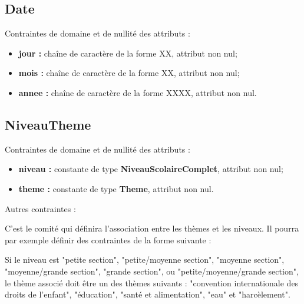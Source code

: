 \documentclass[asi, sansVersion]{picInsa}
\begin{document}
\subsection*{Date}
Contraintes de domaine et de nullité des attributs :
\begin{itemize}
	\item \textbf{jour :} chaîne de caractère de la forme XX, attribut non nul;
	\item \textbf{mois :} chaîne de caractère de la forme XX, attribut non nul;  
	\item \textbf{annee :} chaîne de caractère de la forme XXXX, attribut non nul. 
\end{itemize}

\subsection*{NiveauTheme}
Contraintes de domaine et de nullité des attributs :
\begin{itemize}
	\item \textbf{niveau :} constante de type \textbf{NiveauScolaireComplet}, attribut non nul;
	\item \textbf{theme :} constante de type \textbf{Theme}, attribut non nul.\\
\end{itemize}

Autres contraintes :

C'est le comité qui définira l'association entre les thèmes et les niveaux. Il pourra par exemple définir des contraintes de la forme suivante :

Si le niveau est "petite section", "petite/moyenne section", "moyenne section", "moyenne/grande section", "grande section", ou "petite/moyenne/grande section", le thème associé doit être un des thèmes suivants : "convention internationale des droits de l'enfant", "éducation", "santé et alimentation", "eau" et "harcèlement". \\

%
%
\end{document}
